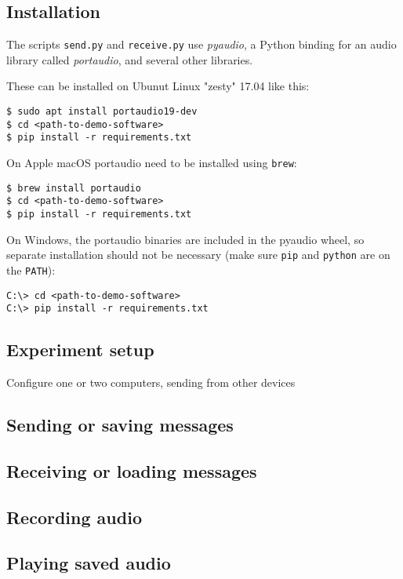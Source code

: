 \documentclass[a4paper]{article}
\begin{document}
\subsection{Installation}

The scripts \texttt{send.py} and \texttt{receive.py} use 
\textit{pyaudio}, a Python binding for an audio library called 
\textit{portaudio}, and several other libraries.

These can be installed on Ubunut Linux "zesty" 17.04 like this:

\begin{lstlisting}
$ sudo apt install portaudio19-dev
$ cd <path-to-demo-software>
$ pip install -r requirements.txt
\end{lstlisting}

On Apple macOS portaudio need to be installed using \texttt{brew}:

\begin{lstlisting}
$ brew install portaudio
$ cd <path-to-demo-software>
$ pip install -r requirements.txt
\end{lstlisting}

On Windows, the portaudio binaries are included in the pyaudio wheel, 
so separate installation should not be necessary (make sure 
\texttt{pip} and \texttt{python} are on the \texttt{PATH}):

\begin{lstlisting}
C:\> cd <path-to-demo-software>
C:\> pip install -r requirements.txt
\end{lstlisting}

\subsection{Experiment setup}
Configure one or two computers, sending from other devices
\subsection{Sending or saving messages}
\subsection{Receiving or loading messages}
\subsection{Recording audio}
\subsection{Playing saved audio}
\end{document}
